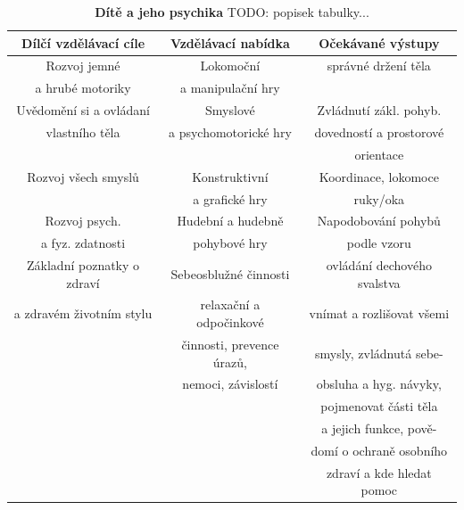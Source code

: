 \begin{table}[h]
	\small
	\begin{tabular}{|c|c|c|}
	\hline
	\rowcolor{grey}
	\textbf{Dílčí vzdělávací cíle}	& \textbf{Vzdělávací nabídka}	& \textbf{Očekávané výstupy}		\\
	\hline
	\hline
	Rozvoj jemné			& Lokomoční 			& správné držení těla	\\
	a hrubé motoriky 		& a manipulační hry 	& 						\\
	\hline
	Uvědomění si a ovládaní & Smyslové 				& Zvládnutí zákl. pohyb.  				\\
	vlastního těla 			& a psychomotorické hry & dovedností a prostorové 	\\
							&						& orientace 				\\
	\hline
	Rozvoj všech smyslů		& Konstruktivní 		& Koordinace, lokomoce 	\\
							& a grafické hry 		& ruky/oka				\\
	\hline
	Rozvoj psych.  			& Hudební a hudebně 	& Napodobování pohybů 	\\
	a fyz. zdatnosti 		& pohybové hry			& podle vzoru			\\
	\hline
	Základní poznatky o zdraví 		& Sebeosblužné činnosti				& ovládání dechového svalstva 				\\
	a zdravém životním stylu		& relaxační a odpočinkové			& vnímat a rozlišovat všemi  			\\
									& činnosti, prevence úrazů, 		& smysly, zvládnutá sebe-  		\\
									& nemoci, závislostí				& obsluha a hyg. návyky,  		\\
									&									& pojmenovat části těla			\\
									& 									& a jejich funkce, pově-  		\\
									&									& domí o ochraně osobního 		\\
									&									& zdraví a kde hledat pomoc 					\\
	\hline
	\end{tabular}
	\caption{ \textbf{Dítě a jeho psychika}
		TODO: popisek tabulky...
	}
\end{table}

